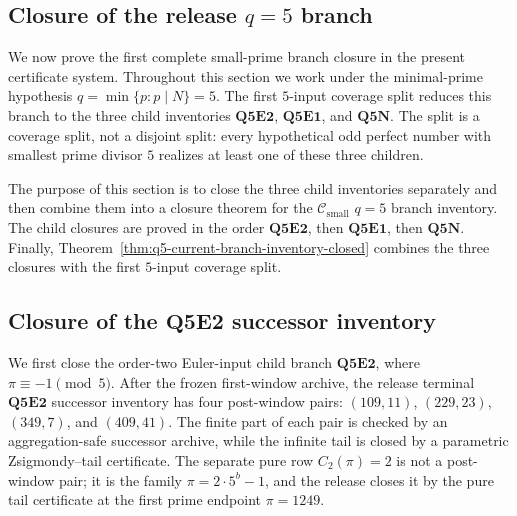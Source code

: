 \documentclass[11pt]{article}
\theoremstyle{definition}
\theoremstyle{remark}
\newcommand{\Csmall}{\ensuremath{\mathcal C_{\mathrm{small}}}}
\begin{document}
\subsection{Closure of the release \texorpdfstring{\(q=5\)}{q=5} branch}
\label{sec:q5-branch-closure}

We now prove the first complete small-prime branch closure in the present
certificate system.  Throughout this section we work under the minimal-prime
hypothesis \(q=\min\{p:p\mid N\}=5\).
The first \(5\)-input coverage split reduces this branch to the three child
inventories \(\mathbf{Q5E2}\), \(\mathbf{Q5E1}\), and \(\mathbf{Q5N}\).
The split is a coverage split, not a disjoint split: every hypothetical odd
perfect number with smallest prime divisor \(5\) realizes at least one of these
three children.

The purpose of this section is to close the three child inventories separately
and then combine them into a closure theorem for the \(\Csmall\) \(q=5\)
branch inventory.  The child closures are proved in the order
\(\mathbf{Q5E2}\), then \(\mathbf{Q5E1}\), then \(\mathbf{Q5N}\).
Finally, Theorem~\ref{thm:q5-current-branch-inventory-closed} combines the three
closures with the first \(5\)-input coverage split.


\subsection{Closure of the \(\mathbf{Q5E2}\) successor inventory}

We first close the order-two Euler-input child branch \(\mathbf{Q5E2}\), where
\(\pi\equiv-1\pmod5\).
After the frozen first-window archive, the release terminal
\(\mathbf{Q5E2}\) successor inventory has four post-window pairs:
\((109,11)\), \((229,23)\), \((349,7)\), and \((409,41)\).
The finite part of each pair is checked by an aggregation-safe successor archive, while the infinite tail is closed by a parametric Zsigmondy--tail certificate.
The separate pure row \(C_2(\pi)=2\) is not a post-window pair; it is the family
\(\pi=2\cdot5^b-1\), and the release closes it by the pure tail certificate at
the first prime endpoint \(\pi=1249\).
\end{document}
